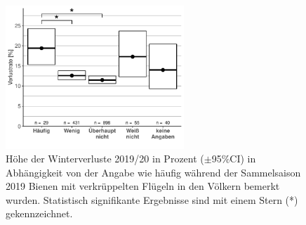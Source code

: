 \begin{figure}[H]
  \centering
  \includegraphics[keepaspectratio,width=0.6\textwidth]{project-U-wintersterblichkeit/figures/plot_factor_crippledbees}
  \caption{Höhe der Winterverluste 2019/20 in Prozent ($\pm$95\%CI) in Abhängigkeit von der Angabe wie häufig während der Sammelsaison 2019 Bienen mit verkrüppelten Flügeln in den Völkern bemerkt wurden. Statistisch signifikante Ergebnisse sind mit einem Stern (*) gekennzeichnet.}
  \label{fig:u:queen:crippledbees}
\end{figure}